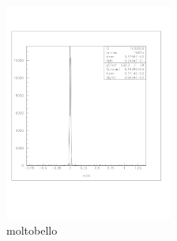 \documentclass[a4paper]{article}
\begin{document}
\begin{figure}[!htb]
  \includegraphics[width=0.49\textwidth]{ex_images/1_010_140_xs.jpg}
  \caption{moltobello}
  \label{fig:010_xs}
\end{figure}
\end{document}

